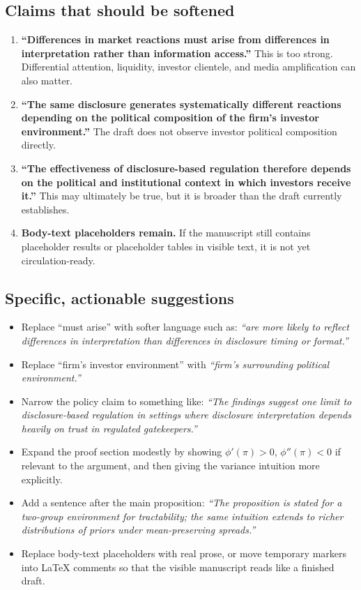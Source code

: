 \documentclass[12pt]{article}
\begin{document}
\subsection*{Claims that should be softened}
\begin{enumerate}[label=\textbf{\arabic*.}, leftmargin=1.75em]
    \item \textbf{``Differences in market reactions must arise from differences in interpretation rather than information access.''} This is too strong. Differential attention, liquidity, investor clientele, and media amplification can also matter.
    \item \textbf{``The same disclosure generates systematically different reactions depending on the political composition of the firm's investor environment.''} The draft does not observe investor political composition directly.
    \item \textbf{``The effectiveness of disclosure-based regulation therefore depends on the political and institutional context in which investors receive it.''} This may ultimately be true, but it is broader than the draft currently establishes.
    \item \textbf{Body-text placeholders remain.} If the manuscript still contains placeholder results or placeholder tables in visible text, it is not yet circulation-ready.
\end{enumerate}

\subsection*{Specific, actionable suggestions}
\begin{itemize}[leftmargin=1.5em]
    \item Replace ``must arise'' with softer language such as: \emph{``are more likely to reflect differences in interpretation than differences in disclosure timing or format.''}
    \item Replace ``firm's investor environment'' with \emph{``firm's surrounding political environment.''}
    \item Narrow the policy claim to something like: \emph{``The findings suggest one limit to disclosure-based regulation in settings where disclosure interpretation depends heavily on trust in regulated gatekeepers.''}
    \item Expand the proof section modestly by showing \(\phi'(\pi)>0\), \(\phi''(\pi)<0\) if relevant to the argument, and then giving the variance intuition more explicitly.
    \item Add a sentence after the main proposition: \emph{``The proposition is stated for a two-group environment for tractability; the same intuition extends to richer distributions of priors under mean-preserving spreads.''}
    \item Replace body-text placeholders with real prose, or move temporary markers into LaTeX comments so that the visible manuscript reads like a finished draft.
\end{itemize}
\end{document}
